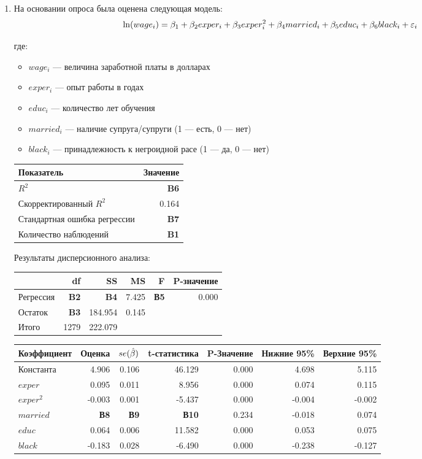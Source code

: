\documentclass[12pt, a4paper]{article}
\begin{document}
\begin{enumerate}

\item На основании опроса была оценена следующая модель:
\[
\ln(wage_i) = \beta_1 + \beta_2 exper_i + \beta_3 exper_i^2 + \beta_4 married_i + \beta_5 educ_i + \beta_6 black_i + \varepsilon_i
\]

где:
\begin{itemize}
\item $wage_i$ — величина заработной платы в долларах
\item $exper_i$ — опыт работы в годах
\item $educ_i$ — количество лет обучения
\item $married_i$ — наличие супруга/супруги (1 — есть, 0 — нет)
\item $black_i$ — принадлежность к негроидной расе (1 — да, 0 — нет)
\end{itemize}

\begin{tabular}{lr} \toprule
Показатель & Значение \\
\midrule
$R^2$                        & \textbf{B6} \\
Скорректированный $R^2$      & 0.164 \\
Стандартная ошибка регрессии & \textbf{B7} \\
Количество наблюдений        & \textbf{B1} \\
\bottomrule
\end{tabular}

Результаты дисперсионного анализа:

\begin{tabular}{lrrrrr} \toprule
 & df & SS & MS & F & P-значение \\
\midrule
Регрессия   & \textbf{B2}  & \textbf{B4}  & 7.425 & \textbf{В5} & 0.000 \\
Остаток     & \textbf{B3} & 184.954 & 0.145 &    &       \\
Итого       & 1279  & 222.079     &       &    &       \\
\bottomrule
\end{tabular}


\begin{tabular}{lrrrrrr} \toprule
Коэффициент & Оценка & $se(\hat{\beta})$ & t-статистика & P-Значение & Нижние 95\% & Верхние 95\% \\
\midrule
Константа & 4.906 & 0.106 & 46.129 & 0.000 & 4.698 & 5.115 \\
$exper$ & 0.095 & 0.011 & 8.956 & 0.000 & 0.074 & 0.115 \\
$exper^2$ & -0.003 & 0.001 & -5.437 & 0.000 & -0.004 & -0.002 \\
$married$ & \textbf{В8} & \textbf{В9} & \textbf{В10} & 0.234 & -0.018 & 0.074 \\
$educ$ & 0.064 & 0.006 & 11.582 & 0.000 & 0.053 & 0.075 \\
$black$ & -0.183 & 0.028 & -6.490 & 0.000 & -0.238 & -0.127 \\
\bottomrule
\end{tabular}


\end{enumerate}
\end{document}
